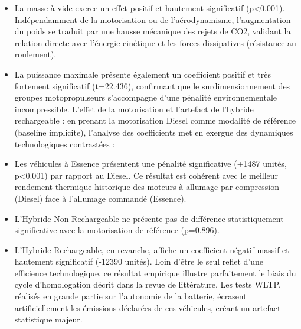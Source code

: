 \begin{itemize}
    \item La masse à vide exerce un effet positif et hautement significatif (p<0.001). Indépendamment de la motorisation ou de l'aérodynamisme, l'augmentation du poids se traduit par une hausse mécanique des rejets de CO2, validant la relation directe avec l'énergie cinétique et les forces dissipatives (résistance au roulement).

    \vspace{0.5em}

    \item La puissance maximale présente également un coefficient positif et très fortement significatif (t=22.436), confirmant que le surdimensionnement des groupes motopropulseurs s'accompagne d'une pénalité environnementale incompressible. L'effet de la motorisation et l'artefact de l'hybride rechargeable : en prenant la motorisation Diesel comme modalité de référence (baseline implicite), l'analyse des coefficients met en exergue des dynamiques technologiques contrastées :

    \vspace{0.5em}

    \item Les véhicules à Essence présentent une pénalité significative (+1487 unités, p<0.001) par rapport au Diesel. Ce résultat est cohérent avec le meilleur rendement thermique historique des moteurs à allumage par compression (Diesel) face à l'allumage commandé (Essence).

    \vspace{0.5em}

    \item L'Hybride Non-Rechargeable ne présente pas de différence statistiquement significative avec la motorisation de référence (p=0.896).

    \vspace{0.5em}

    \item L'Hybride Rechargeable, en revanche, affiche un coefficient négatif massif et hautement significatif (-12390 unités). Loin d'être le seul reflet d'une efficience technologique, ce résultat empirique illustre parfaitement le biais du cycle d'homologation décrit dans la revue de littérature. Les tests WLTP, réalisés en grande partie sur l'autonomie de la batterie, écrasent artificiellement les émissions déclarées de ces véhicules, créant un artefact statistique majeur.

    \vspace{0.5em}


\end{itemize}
